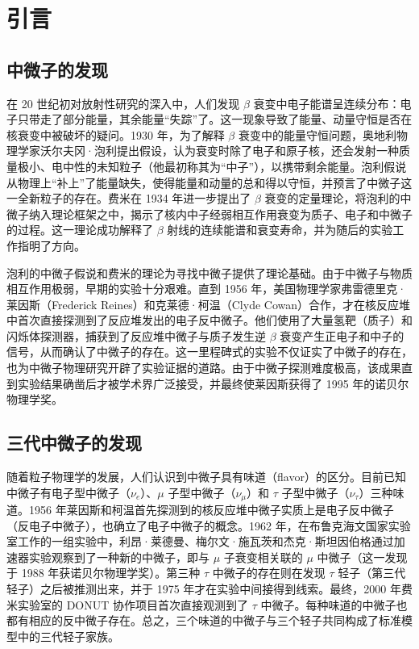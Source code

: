 \chapter{引言}
\section{中微子的发现}


在 20 世纪初对放射性研究的深入中，人们发现 $\beta$ 衰变中电子能谱呈连续分布：电子只带走了部分能量，其余能量“失踪”了\cite{Chadwick1914Beta}。这一现象导致了能量、动量守恒是否在核衰变中被破坏的疑问。1930 年，为了解释 $\beta$ 衰变中的能量守恒问题，奥地利物理学家沃尔夫冈·泡利提出假设，认为衰变时除了电子和原子核，还会发射一种质量极小、电中性的未知粒子（他最初称其为“中子”），以携带剩余能量\cite{Pauli1930Letter}。泡利假说从物理上“补上”了能量缺失，使得能量和动量的总和得以守恒，并预言了中微子这一全新粒子的存在。费米在 1934 年进一步提出了 $\beta$ 衰变的定量理论，将泡利的中微子纳入理论框架之中，揭示了核内中子经弱相互作用衰变为质子、电子和中微子的过程\cite{Fermi1934Beta}。这一理论成功解释了 $\beta$ 射线的连续能谱和衰变寿命，并为随后的实验工作指明了方向。

泡利的中微子假说和费米的理论为寻找中微子提供了理论基础。由于中微子与物质相互作用极弱，早期的实验十分艰难\cite{Bethe1934Nature}。直到 1956 年，美国物理学家弗雷德里克·莱因斯（Frederick Reines）和克莱德·柯温（Clyde Cowan）合作，才在核反应堆中首次直接探测到了反应堆发出的电子反中微子。他们使用了大量氢靶（质子）和闪烁体探测器，捕获到了反应堆中微子与质子发生逆 $\beta$ 衰变产生正电子和中子的信号，从而确认了中微子的存在\cite{Cowan1956Science}。这一里程碑式的实验不仅证实了中微子的存在，也为中微子物理研究开辟了实验证据的道路。由于中微子探测难度极高，该成果直到实验结果确凿后才被学术界广泛接受，并最终使莱因斯获得了 1995 年的诺贝尔物理学奖\cite{Reines1996Nobel}。

\section{三代中微子的发现}
随着粒子物理学的发展，人们认识到中微子具有味道（flavor）的区分。目前已知中微子有电子型中微子（$\nu_e$）、$\mu$ 子型中微子（$\nu_\mu$）和 $\tau$ 子型中微子（$\nu_\tau$）三种味道\cite{ALEPH2006LEP}。1956 年莱因斯和柯温首先探测到的核反应堆中微子实质上是电子反中微子（反电子中微子），也确立了电子中微子的概念。1962 年，在布鲁克海文国家实验室工作的一组实验中，利昂·莱德曼、梅尔文·施瓦茨和杰克·斯坦因伯格通过加速器实验观察到了一种新的中微子，即与 $\mu$ 子衰变相关联的 $\mu$ 中微子（这一发现于 1988 年获诺贝尔物理学奖）\cite{Danby1962MuonNeutrino}。第三种 $\tau$ 中微子的存在则在发现 $\tau$ 轻子（第三代轻子）之后被推测出来\cite{Perl1975TauLepton}，并于 1975 年才在实验中间接得到线索。最终，2000 年费米实验室的 DONUT 协作项目首次直接观测到了 $\tau$ 中微子\cite{DONUT2001TauNeutrino}。每种味道的中微子也都有相应的反中微子存在。总之，三个味道的中微子与三个轻子共同构成了标准模型中的三代轻子家族。

